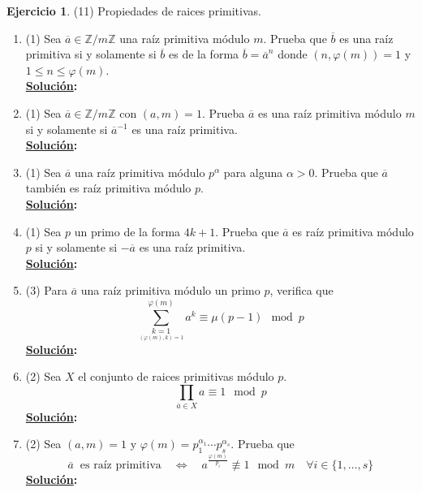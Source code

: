 \documentclass[11pt,letterpaper]{article}
\theoremstyle{definition}\newtheorem{p}{Ejercicio}
\newcommand{\Z}{\mathbb{Z}}
\newcommand{\sii}{\Longleftrightarrow}
\newcommand{\clase}[1]{\overline{#1}}  %
\newcommand{\sol}{\textbf{\underline{Solución}: }} %
\begin{document}
\begin{p}(11)
Propiedades de raices primitivas.
\begin{enumerate}
  \item(1) Sea $\overline{a}\in\Z/m\Z$ una ra\'iz primitiva m\'odulo $m$. Prueba que $\clase{b}$ es
  una ra\'iz primitiva si y solamente si $\clase{b}$ es de la forma $\clase{b}=\clase{a}^n$ donde
  $(n,\varphi(m))=1$ y $1\leq n\leq\varphi(m)$.\\
  \sol

  \item(1) Sea $\clase{a}\in\Z/m\Z$ con $(a,m)=1$. Prueba $\clase{a}$ es una ra\'iz primitiva
  m\'odulo $m$ si y solamente si $\clase{a}^{-1}$ es una ra\'iz primitiva.\\
  \sol

  \item(1) Sea $\clase{a}$ una ra\'iz primitiva m\'odulo $p^{\alpha}$ para alguna $\alpha>0$. Prueba
  que $\clase{a}$ tambi\'en es ra\'iz primitiva m\'odulo $p$.\\
  \sol

  \item(1) Sea $p$ un primo de la forma $4k+1$. Prueba que $\clase{a}$ es ra\'iz primitiva m\'odulo $p$
  si y solamente si $-\clase{a}$ es una ra\'iz primitiva.\\
  \sol

  \item(3) Para $\clase{a}$ una ra\'iz primitiva m\'odulo un primo $p$, verifica que
  \[
    \sum_{\underset{(\varphi(m),k)=1}{k=1}}^{\varphi(m)}a^k \equiv \mu(p-1) \mod p
  \]
  \sol

  \item(2) Sea $X$ el conjunto de raices primitivas m\'odulo $p$.
  \[
    \prod_{\clase{a}\in X}a\equiv 1\mod p
  \]
  \sol

  \item(2) Sea $(a,m)=1$ y $\varphi(m)=p_1^{\alpha_1}\cdots p_s^{\alpha_s}$. Prueba que
  \[
    \clase{a}\;\;\text{es ra\'iz primitiva}\quad\sii\quad
    a^{\frac{\varphi(m)}{p_i}}\not\equiv 1\mod m\quad\forall i\in\{1,\ldots,s\}
  \]
  \sol
\end{enumerate}
\end{p}
\end{document}
